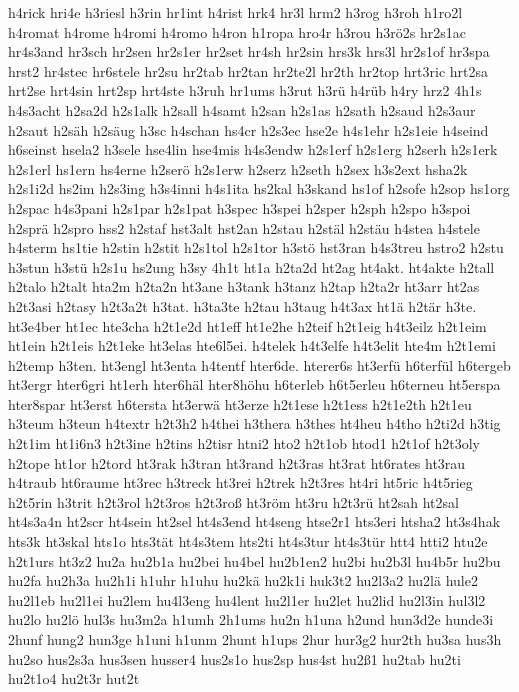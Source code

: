 {h4rick
hri4e
h3riesl
h3rin
hr1int
h4rist
hrk4
hr3l
hrm2
h3rog
h3roh
h1ro2l
h4romat
h4rome
h4romi
h4romo
h4ron
h1ropa
hro4r
h3rou
h3rö2s
hr2s1ac
hr4s3and
hr3sch
hr2sen
hr2s1er
hr2set
hr4sh
hr2sin
hrs3k
hrs3l
hr2s1of
hr3spa
hrst2
hr4stec
hr6stele
hr2su
hr2tab
hr2tan
hr2te2l
hr2th
hr2top
hrt3ric
hrt2sa
hrt2se
hrt4sin
hrt2sp
hrt4ste
h3ruh
hr1ums
h3rut
h3rü
h4rüb
h4ry
hrz2
4h1s
h4s3acht
h2sa2d
h2s1alk
h2sall
h4samt
h2san
h2s1as
h2sath
h2saud
h2s3aur
h2saut
h2säh
h2säug
h3sc
h4schan
hs4cr
h2s3ec
hse2e
h4s1ehr
h2s1eie
h4seind
h6seinst
hsela2
h3sele
hse4lin
hse4mis
h4s3endw
h2s1erf
h2s1erg
h2serh
h2s1erk
h2s1erl
hs1ern
hs4erne
h2serö
h2s1erw
h2serz
h2seth
h2sex
h3s2ext
hsha2k
h2s1i2d
hs2im
h2s3ing
h3s4inni
h4s1ita
hs2kal
h3skand
hs1of
h2sofe
h2sop
hs1org
h2spac
h4s3pani
h2s1par
h2s1pat
h3spec
h3spei
h2sper
h2sph
h2spo
h3spoi
h2sprä
h2spro
hss2
h2staf
hst3alt
hst2an
h2stau
h2stäl
h2stäu
h4stea
h4stele
h4sterm
hs1tie
h2stin
h2stit
h2s1tol
h2s1tor
h3stö
hst3ran
h4s3treu
hstro2
h2stu
h3stun
h3stü
h2s1u
hs2ung
h3sy
4h1t
ht1a
h2ta2d
ht2ag
ht4akt.
ht4akte
h2tall
h2talo
h2talt
hta2m
h2ta2n
ht3ane
h3tank
h3tanz
h2tap
h2ta2r
ht3arr
ht2as
h2t3asi
h2tasy
h2t3a2t
h3tat.
h3ta3te
h2tau
h3taug
h4t3ax
ht1ä
h2tär
h3te.
ht3e4ber
ht1ec
hte3cha
h2t1e2d
ht1eff
ht1e2he
h2teif
h2t1eig
h4t3eilz
h2t1eim
ht1ein
h2t1eis
h2t1eke
ht3elas
hte6l5ei.
h4telek
h4t3elfe
h4t3elit
hte4m
h2t1emi
h2temp
h3ten.
ht3engl
ht3enta
h4tentf
hter6de.
hterer6s
ht3erfü
h6terfül
h6tergeb
ht3ergr
hter6gri
ht1erh
hter6häl
hter8höhu
h6terleb
h6t5erleu
h6terneu
ht5erspa
hter8spar
ht3erst
h6tersta
ht3erwä
ht3erze
h2t1ese
h2t1ess
h2t1e2th
h2t1eu
h3teum
h3teun
h4textr
h2t3h2
h4thei
h3thera
h3thes
ht4heu
h4tho
h2ti2d
h3tig
h2t1im
ht1i6n3
h2t3ine
h2tins
h2tisr
htni2
hto2
h2t1ob
htod1
h2t1of
h2t3oly
h2tope
ht1or
h2tord
ht3rak
h3tran
ht3rand
h2t3ras
ht3rat
ht6rates
ht3rau
h4traub
ht6raume
ht3rec
h3treck
ht3rei
h2trek
h2t3res
ht4ri
ht5ric
h4t5rieg
h2t5rin
h3trit
h2t3rol
h2t3ros
h2t3roß
ht3röm
ht3ru
h2t3rü
ht2sah
ht2sal
ht4s3a4n
ht2scr
ht4sein
ht2sel
ht4s3end
ht4seng
htse2r1
hts3eri
htsha2
ht3s4hak
hts3k
ht3skal
hts1o
hts3tät
ht4s3tem
hts2ti
ht4s3tur
ht4s3tür
htt4
htti2
htu2e
h2t1urs
ht3z2
hu2a
hu2b1a
hu2bei
hu4bel
hu2b1en2
hu2bi
hu2b3l
hu4b5r
hu2bu
hu2fa
hu2h3a
hu2h1i
h1uhr
h1uhu
hu2kä
hu2k1i
huk3t2
hu2l3a2
hu2lä
hule2
hu2l1eb
hu2l1ei
hu2lem
hu4l3eng
hu4lent
hu2l1er
hu2let
hu2lid
hu2l3in
hul3l2
hu2lo
hu2lö
hul3s
hu3m2a
h1umh
2h1ums
hu2n
h1una
h2und
hun3d2e
hunde3i
2hunf
hung2
hun3ge
h1uni
h1unm
2hunt
h1ups
2hur
hur3g2
hur2th
hu3sa
hus3h
hu2so
hus2s3a
hus3sen
husser4
hus2s1o
hus2sp
hus4st
hu2ß1
hu2tab
hu2ti
hu2t1o4
hu2t3r
hut2t
}

